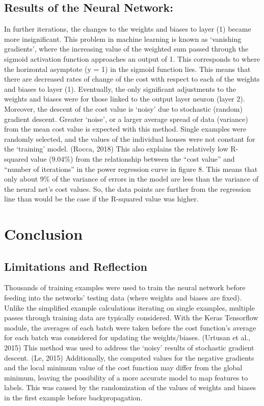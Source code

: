 \documentclass[12pt,a4paper]{article}
\begin{document}
\subsection{Results of the Neural Network:}
In further iterations, the changes to the weights and biases to layer (1) became more insignificant. This problem in machine learning is known as ‘vanishing gradients’, where the increasing value of the weighted sum passed through the sigmoid activation function approaches an output of 1. This corresponds to where the horizontal asymptote (y = 1) in the sigmoid function lies. This means that there are decreased rates of change of the cost with respect to each of the weights and biases to layer (1). Eventually, the only significant adjustments to the weights and biases were for those linked to the output layer neuron (layer 2). Moreover, the descent of the cost value is ‘noisy’ due to stochastic (random) gradient descent. Greater ‘noise’, or a larger average spread of data (variance) from the mean cost value is expected with this method. Single examples were randomly selected, and the values of the individual houses were not constant for the ‘training’ model. (Rocca, 2018) This also explains the relatively low R-squared value ($9.04\%$) from the relationship between the “cost value” and “number of iterations” in the power regression curve in figure 8. This means that only about 9$\%$ of the variance of errors in the model are less than the variance of the neural net’s cost values. So, the data points are further from the regression line than would be the case if the R-squared value was higher.



\section{Conclusion}

\subsection{Limitations and Reflection}

Thousands of training examples were used to train the neural network before feeding into the networks’ testing data (where weights and biases are fixed). Unlike the simplified example calculations iterating on single examples, multiple passes through training data are typically considered. With the Keras Tensorflow module, the averages of each batch were taken before the cost function’s average for each batch was considered for updating the weights/biases. (Urtusan et al., 2015) This method was used to address the ‘noisy’ results of stochastic gradient descent. (Le, 2015) Additionally, the computed values for the negative gradients and the local minimum value of the cost function may differ from the global minimum, leaving the possibility of a more accurate model to map features to labels. This was caused by the randomization of the values of weights and biases in the first example before backpropagation. 
\end{document}
